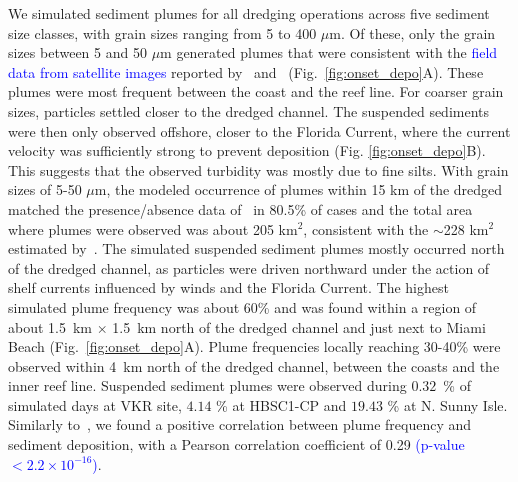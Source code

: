 \documentclass[preprint,12pt,authoryear]{elsarticle}
\newcommand{\modif}[1]{\textcolor{blue}{#1}}
\begin{document}
We simulated sediment plumes for all dredging operations across five sediment size classes, with grain sizes ranging from 5 to 400 $\mu$m. Of these, only the grain sizes between 5 and 50 $\mu$m generated plumes that were consistent with the \modif{field data from satellite images} reported by~\cite{barnes2015sediment} and~\cite{cunning2019extensive} (Fig.~\ref{fig:onset_depo}A). These plumes were most frequent between the coast and the reef line. For coarser grain sizes, particles settled closer to the dredged channel. The suspended sediments were then only observed offshore, closer to the Florida Current, where the current velocity was sufficiently strong to prevent deposition (Fig. \ref{fig:onset_depo}B). This suggests that the observed turbidity was mostly due to fine silts. With grain sizes of 5-50 $\mu$m, the modeled occurrence of plumes  within 15 km of the dredged matched the presence/absence data of~\cite{cunning2019extensive} in 80.5\% of cases and the total area where plumes were observed was about 205 km$^2$, consistent with the $\sim$228 km$^2$ estimated by~\cite{barnes2015sediment}. The simulated suspended sediment plumes mostly occurred north of the dredged channel, as particles were driven northward under the action of shelf currents influenced by winds and the Florida Current. The highest simulated plume frequency was about 60\% and was found within a region of about 1.5~km $\times$ 1.5~km north of the dredged channel and just next to Miami Beach (Fig.~\ref{fig:onset_depo}A). Plume frequencies locally reaching 30-40\% were observed within 4~km north of the dredged channel, between the coasts and the inner reef line. Suspended sediment plumes were observed during $0.32$~\% of simulated days at VKR site, $4.14$ \% at HBSC1-CP and $19.43$ \% at N. Sunny Isle. Similarly to~\cite{cunning2019extensive}, we found a positive correlation between plume frequency and sediment deposition, with a Pearson correlation coefficient of 0.29 \modif{(p-value $< 2.2\times 10^{-16}$)}.

\end{document}

